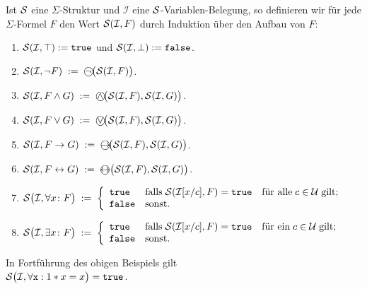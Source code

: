 \begin{Definition}
    Ist $\mathcal{S}$ eine $\Sigma$-Struktur und $\mathcal{I}$ eine $\mathcal{S}$-Variablen-Belegung,
    so definieren wir f\"{u}r jede $\Sigma$-Formel $F$ den Wert $\mathcal{S}(\mathcal{I},F)$
    durch Induktion \"{u}ber den Aufbau von $F$:
    \begin{enumerate}
    \item $\mathcal{S}(\mathcal{I},\top) := \mathtt{true}$ und $\mathcal{S}(\mathcal{I},\bot) := \mathtt{false}$.
    \item $\struct(\mathcal{I}, \neg F) \;:=\; \circneg\bigl(\struct(\mathcal{I}, F)\bigr)$.
    \item $\struct(\mathcal{I}, F \wedge G) \;:=\; \circwedge\bigl(\struct(\mathcal{I}, F), \struct(\mathcal{I}, G)\bigr)$.
    \item $\struct(\mathcal{I}, F \vee G) \;:=\; \circvee\bigl(\struct(\mathcal{I}, F), \struct(\mathcal{I}, G)\bigr)$.
    \item $\struct(\mathcal{I}, F \rightarrow G) \;:=\; \circright\!\bigl(\struct(\mathcal{I}, F), \struct(\mathcal{I}, G)\bigr)$.
    \item $\struct(\mathcal{I}, F \leftrightarrow G) \;:=\; \circleftright\bigl(\struct(\mathcal{I}, F), \struct(\mathcal{I}, G)\bigr)$.
    \item $\mathcal{S}\bigl(\mathcal{I}, \forall x\colon F\bigr) \;:=\; \left\{
      \begin{array}{ll}
         \mathtt{true}  & \mbox{falls}\; \mathcal{S}(\mathcal{I}[x/c], F) = \mathtt{true}\quad \mbox{f\"{u}r alle}\; c\in \mathcal{U}\;\mbox{gilt}; \\
         \mathtt{false} & \mbox{sonst}.
      \end{array}
      \right.$
    \item $\mathcal{S}\bigl(\mathcal{I}, \exists x \colon F\bigr) \;:=\; \left\{
      \begin{array}{ll}
         \mathtt{true}  & \mbox{falls}\; \mathcal{S}(\mathcal{I}[x/c], F) = \mathtt{true}\quad \mbox{f\"{u}r ein}\; c\in \mathcal{U}\;\mbox{gilt}; \\
         \mathtt{false} & \mbox{sonst}.
      \end{array}
      \right.$\eox    
    \end{enumerate}
\end{Definition}

\example
In Fortf\"{u}hrung des obigen Beispiels gilt \\[0.2cm]
\hspace*{1.3cm}  $\mathcal{S}\bigl(\mathcal{I}, \forall \mathtt{x}: 1 * x = x \bigr) = \mathtt{true}$.
\eox

